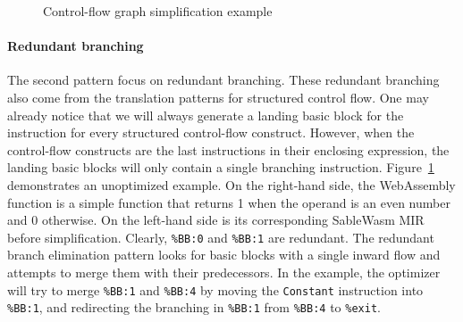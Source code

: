 \begin{figure}
    \begin{minipage}[t]{.5\textwidth}
        
    \end{minipage}\hfill
    \begin{minipage}[t]{.5\textwidth}
        
    \end{minipage}
    \caption{Control-flow graph simplification example}
    \label{fig:simplify-example}
\end{figure}

\paragraph{Redundant branching}
The second pattern focus on redundant branching. These redundant branching also come from the translation patterns for structured control flow. One may already notice that we will always generate a landing basic block for the instruction for every structured control-flow construct. However, when the control-flow constructs are the last instructions in their enclosing expression, the landing basic blocks will only contain a single branching instruction. Figure~\ref{fig:simplify-example} demonstrates an unoptimized example. On the right-hand side, the WebAssembly function is a simple function that returns 1 when the operand is an even number and 0 otherwise. On the left-hand side is its corresponding SableWasm MIR before simplification. Clearly, \texttt{\%BB:0} and \texttt{\%BB:1} are redundant. The redundant branch elimination pattern looks for basic blocks with a single inward flow and attempts to merge them with their predecessors. In the example, the optimizer will try to merge \texttt{\%BB:1} and \texttt{\%BB:4} by moving the \texttt{Constant} instruction into \texttt{\%BB:1}, and redirecting the branching in \texttt{\%BB:1} from \texttt{\%BB:4} to \texttt{\%exit}.

